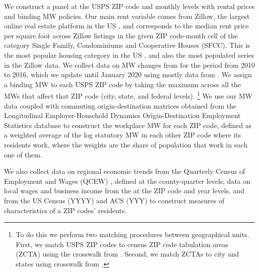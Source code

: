 We construct a panel at the USPS ZIP code and monthly levels with rental prices 
and binding MW policies.
Our main rent variable comes from Zillow, the largest online real estate platform 
in the US \parencite{realestateagentpdx, investopedia}, and corresponds to the 
median rent price per square foot across Zillow listings in the given ZIP code-month 
cell of the category Single Family, Condominiums and Cooperative Houses (SFCC). 
This is the most popular housing category in the US \parencite{Fernald2020}, 
and also the most populated series in the Zillow data.
We collect data on MW changes from \textcite{VaghulZipperer2016} for the 
period from 2010 to 2016, which we update until January 2020 using mostly data from
\textcite{BerkeleyLaborCenter}.
We assign a binding MW to each USPS ZIP code by taking the maximum across all the
MWs that affect that ZIP code (city, state, and federal levels).%
\footnote{To do this we perform two matching procedures between geographical units.
First, we match USPS ZIP codes to census ZIP code tabulation areas (ZCTA) using 
the crosswalk from \textcite{UDSMapper}.
Second, we match ZCTAs to city and states using crosswalk from \textcite{MissouriCenter}.}
We use our MW data coupled with commuting origin-destination matrices obtained from 
the Longitudinal Employer-Household Dynamics Origin-Destination Employment 
Statistics \textcite[LODES;][]{LODES} database to construct the workplace MW for 
each ZIP code, defined as a weighted average of the log statutory MW in each other 
ZIP code where its residents work, where the weights are the share of population 
that work in each one of them.

We also collect data on regional economic trends from the Quarterly Census of 
Employment and Wages (QCEW) \textcite{qcew}, defined at the county-quarter levels;
data on local wages and business income from the \textcite{IRS} at the ZIP code 
and year levels, and from the US Census (YYYY) and ACS (YYY) to construct measures 
of characteristics of a ZIP codes' residents.


